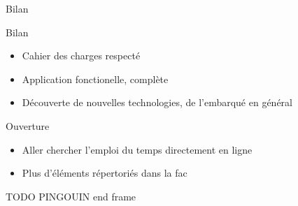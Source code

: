 \documentclass{beamer}
\begin{document}
		\begin{frame}{Bilan}
			\begin{block}{Bilan}
				\begin{itemize}
					\item Cahier des charges respecté
					\item Application fonctionelle, complète
					\item Découverte de nouvelles technologies, de l'embarqué en général
				\end{itemize}
			\end{block}
			\pause
			\begin{exampleblock}{Ouverture}
				\begin{itemize}
				\item Aller chercher l'emploi du temps directement en ligne
				\item Plus d'éléments répertoriés dans la fac
				
				\end{itemize}
			\end{exampleblock}
		\end{frame}
		
		\begin{frame}{TODO PINGOUIN}
			end frame
		\end{frame}	
\end{document}
